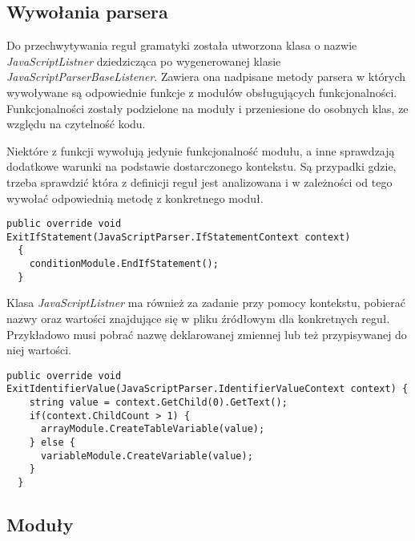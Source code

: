 \subsection{Wywołania parsera}

Do przechwytywania reguł gramatyki została utworzona klasa o nazwie \textit{JavaScriptListner} dziedzicząca po wygenerowanej klasie \textit{JavaScriptParserBaseListener}. Zawiera ona nadpisane metody parsera w których wywoływane są odpowiednie funkcje z modułów obsługujących funkcjonalności. Funkcjonalności zostały podzielone na moduły i przeniesione do osobnych klas, ze względu na czytelność kodu.
\par Niektóre z funkcji wywołują jedynie funkcjonalność modułu, a inne sprawdzają dodatkowe warunki na podstawie dostarczonego kontekstu. Są przypadki gdzie, trzeba sprawdzić która z definicji reguł jest analizowana i w zależności od tego wywołać odpowiednią metodę z konkretnego moduł.

\begin{lstlisting}[language=CSharp, caption=Przykład prostej funkcji listnera=alg:komListner1]
  public override void ExitIfStatement(JavaScriptParser.IfStatementContext context)
  {
    conditionModule.EndIfStatement();
  }
\end{lstlisting}

\par Klasa \textit{JavaScriptListner} ma również za zadanie przy pomocy kontekstu, pobierać nazwy oraz wartości znajdujące się w pliku źródłowym dla konkretnych reguł. Przykładowo musi pobrać nazwę deklarowanej zmiennej lub też przypisywanej do niej wartości.

\begin{lstlisting}[language=CSharp, caption=Przykład funkcji listnera z sprawdzeniem kontekstu=alg:komListner2]
  public override void ExitIdentifierValue(JavaScriptParser.IdentifierValueContext context) {
    string value = context.GetChild(0).GetText();
    if(context.ChildCount > 1) {
      arrayModule.CreateTableVariable(value);
    } else {
      variableModule.CreateVariable(value);
    }
  }
\end{lstlisting}

\subsection{Moduły}


